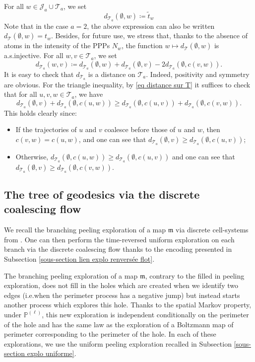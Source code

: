 \documentclass[11pt]{article}
\numberwithin{equation}{section}
\def \T{\mathcal{T}}
\def\P{\mathbb{P}}
\begin{document}
For all $w \in \mathcal{J}_a \cup \mathcal{T}_a$, we set
\begin{equation}\label{eq hauteur sur T}
d_{\mathcal{T}_a}(\emptyset, w) \coloneqq \widetilde{t}_w
\end{equation}
Note that in the case $a=2$, the above expression can also be written $d_{\mathcal{T}}(\emptyset, w)= t_w$. Besides, for future use, we stress that, thanks to the absence of atom{s} in the intensity of the PPPs $N_w$, the function $w \mapsto d_{\mathcal{T}}(\emptyset, w)$ is a.s.\@ injective.
For all $w, v \in \mathcal{T}_a $, we set
\begin{equation}\label{eq distance sur T}
d_{\mathcal{T}_a}(w,v) \coloneqq d_{\mathcal{T}_a}(\emptyset, w) +d_{\mathcal{T}_a}(\emptyset, v)-2d_{\mathcal{T}_a}(\emptyset, c(v,w)).
\end{equation}
It is easy to check that $d_{\mathcal{T}_a}$ is a distance on $\mathcal{T}_a$. Indeed, positivity and symmetry are obvious. For the triangle inequality, by \eqref{eq distance sur T} it suffices to check that for all $u,v,w \in \mathcal{T}_a$, we have
$$
d_{\T_a} (\emptyset, v) + d_{\T_a}(\emptyset ,c(u,w)) \ge d_{\T_a}(\emptyset,c(u,v)) + d_{\T_a}(\emptyset, c(v,w)).
$$
This holds clearly since:
\begin{itemize}
\item If the trajectories of $u$ and $v$ coalesce before those of $u$ and $w$, then $c(v,w) = c(u,w)$, and one can see that $d_{\T_a}(\emptyset, v) \ge d_{\T_a}(\emptyset , c(u,v))$;
\item Otherwise, $d_{\T_a}(\emptyset, c(u,w)) \ge d_{\T_a}(\emptyset, c(u,v))$ and one can see that $d_{\T_a}(\emptyset, v) \ge d_{\T_a}(\emptyset , c(v,w))$.
\end{itemize}

\subsection{The tree of geodesics via the discrete coalescing flow}

We recall the branching peeling exploration of a map $\mathfrak{m}$ via discrete cell-systems from \cite{BCM,BBCK}. One can then perform the time-reversed uniform exploration on each branch via the discrete coalescing flow thanks to the encoding presented in Subsection \ref{sous-section lien explo renversée flot}.

The branching peeling exploration of a map $\mathfrak{m}$, contrary to the filled in peeling exploration, does not fill in the holes which are created when we identify two edges (i.e.\@ when the perimeter process has a negative jump) but instead starts another process which explores this hole. Thanks to the spatial Markov property, under $\P^{(\ell)}$, this new exploration is independent conditionally on the perimeter of the hole and has the same law as the exploration of a Boltzmann map of perimeter corresponding to the perimeter of the hole. {In each of these explorations, we use the uniform peeling exploration recalled in Subsection \ref{sous-section explo uniforme}.}
\end{document}
